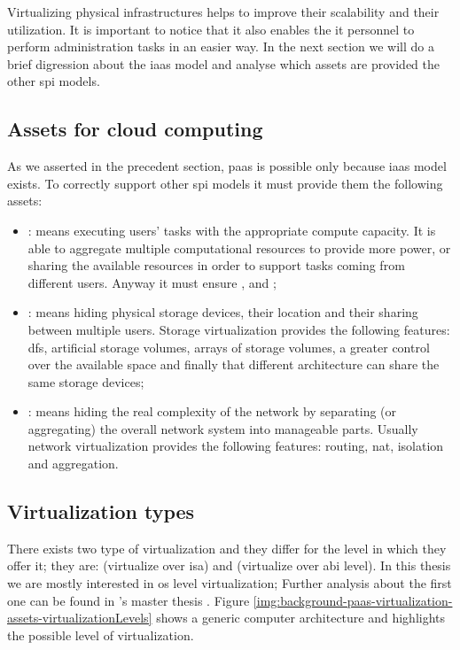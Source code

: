 Virtualizing physical infrastructures helps to improve their scalability and their utilization. It is 
important to notice that it also enables the \acs{it} personnel to perform administration tasks in an
easier way. In the next section we will do a brief digression about the \ac{iaas} model and analyse
which assets are provided the other \ac{spi} models.

\subsection{Assets for cloud computing}
\label{sec:background-virtualization-assets}
As we asserted in the precedent section, \ac{paas} is possible only because \ac{iaas} model exists.
To correctly support other \ac{spi} models it must provide them the following assets:

\begin{itemize}
	\item{: means executing users' tasks with the appropriate compute capacity. It is
		able to aggregate multiple computational resources to provide more power, or sharing the available
		resources in order to support tasks coming from different users. Anyway it must ensure
		,  and ;}
	\item{: means hiding physical storage devices, their location and their sharing between
		multiple users. Storage virtualization provides the following features: \ac{dfs},
		artificial storage volumes, arrays of storage volumes, a greater control over the available space and
		finally that different architecture can share the same storage devices;}
	\item{: means hiding the real complexity of the network by separating (or aggregating)
		the overall network system into manageable parts. Usually network virtualization provides the 
		following features: routing, \ac{nat}, isolation and aggregation.}
\end{itemize}

\subsection{Virtualization types}
\label{sec:background-virtualization-types}
There exists two type of virtualization and they differ for the level in which they offer it; they
are:  (virtualize over \ac{isa}) and  (virtualize over \ac{abi} level). In this thesis we are mostly interested in \acs{os}
level virtualization; Further analysis about the first one can be found in \citeauthor{gardimanThesis}'s
master thesis \cite{gardimanThesis}.
Figure \ref{img:background-paas-virtualization-assets-virtualizationLevels}
shows a generic computer architecture and highlights the possible level of virtualization.

